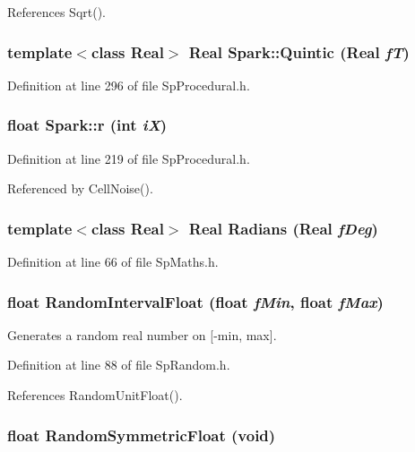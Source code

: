 References Sqrt().
\subsubsection{\setlength{\rightskip}{0pt plus 5cm}template$<$class Real$>$ Real Spark::Quintic (Real {\em f\-T})}\label{namespaceSpark_a99}


Definition at line 296 of file Sp\-Procedural.h.
\subsubsection{\setlength{\rightskip}{0pt plus 5cm}float Spark::r (int {\em i\-X})\hspace{0.3cm}{\tt  [inline]}}\label{namespaceSpark_a92}


Definition at line 219 of file Sp\-Procedural.h.

Referenced by Cell\-Noise().
\subsubsection{\setlength{\rightskip}{0pt plus 5cm}template$<$class Real$>$ Real Radians (Real {\em f\-Deg})}\label{namespaceSpark_a38}


Definition at line 66 of file Sp\-Maths.h.
\subsubsection{\setlength{\rightskip}{0pt plus 5cm}float Random\-Interval\-Float (float {\em f\-Min}, float {\em f\-Max})\hspace{0.3cm}{\tt  [inline]}}\label{namespaceSpark_a117}


Generates a random real number on [-min, max]. 

Definition at line 88 of file Sp\-Random.h.

References Random\-Unit\-Float().
\subsubsection{\setlength{\rightskip}{0pt plus 5cm}float Random\-Symmetric\-Float (void)\hspace{0.3cm}{\tt  [inline]}}\label{namespaceSpark_a116}


